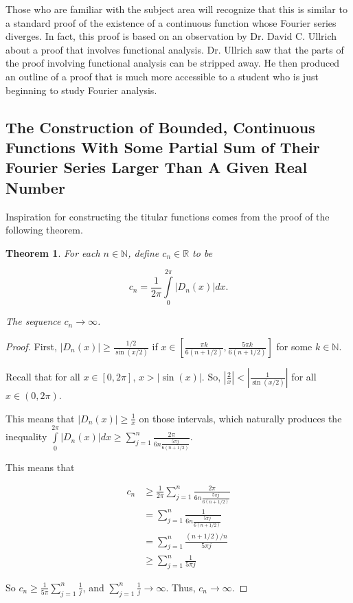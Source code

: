 \documentclass{amsart}
\newcommand{\N}{\mathbb{N}}
\newcommand{\R}{\mathbb{R}}
\newcommand{\absval}[1]{\left| #1 \right|}
\newtheorem{thm}{Theorem}[section]
\theoremstyle{definition}
\begin{document}
Those who are familiar with the subject area will recognize that this is similar to a standard proof of the existence of a continuous function whose Fourier series diverges. 
In fact, this proof is based on an observation by Dr. David C. Ullrich about a proof that involves functional analysis. 
Dr. Ullrich saw that the parts of the proof involving functional analysis can be stripped away. 
He then produced an outline of a proof that is much more accessible to a student who is just beginning to study Fourier analysis.

\subsection{The Construction of Bounded, Continuous Functions With Some Partial Sum of Their Fourier Series Larger Than A Given Real Number}\hspace*{\fill}

Inspiration for constructing the titular functions comes from the proof of the following theorem.

\begin{thm}
For each $n \in \N$, define $c_n \in \R$ to be

\begin{displaymath}
c_n = \frac{1}{2 \pi} \int\limits_0^{2\pi} \absval{D_n(x)} dx.
\end{displaymath}

The sequence $c_n \to \infty$.
\end{thm}

\begin{proof}

First, $\absval{D_n(x)} \geq \frac{1/2}{\sin(x/2)}$ if $x \in [\frac{\pi k}{6(n+1/2)},\frac{5 \pi k}{6(n+1/2)}]$ for some $k \in \N$.

Recall that for all $x \in [0, 2\pi]$, $x > \absval{\sin(x)}$. 
So, $\absval{\frac{2}{x}} < \absval{\frac{1}{\sin(x/2)}}$ for all $x \in (0,2\pi)$.

This means that $\absval{D_n(x)} \geq \frac{1}{x}$ on those intervals, which naturally produces the inequality $\int\limits_0^{2\pi} \absval{D_n(x)} dx \geq \sum\limits_{j=1}^n \frac{2 \pi}{6n \frac{5\pi j}{6(n+1/2)}}$. 

This means that 

\begin{align*}
c_n &\geq \frac{1}{2 \pi} \sum\limits_{j=1}^n \frac{2 \pi}{6n \frac{5\pi j}{6(n+1/2)}}\\
&= \sum\limits_{j=1}^n \frac{1}{6n \frac{5\pi j}{6(n+1/2)}}\\
&= \sum\limits_{j=1}^n \frac{(n+1/2)/{n}}{5\pi j}\\
&\geq \sum\limits_{j=1}^n \frac{1}{5\pi j}
\end{align*}

So $c_n \geq \frac{1}{5 \pi} \sum\limits_{j=1}^n \frac{1}{ j}$, and $\sum\limits_{j=1}^n \frac{1}{j} \to \infty$. 
Thus, $c_n \to \infty$.

\end{proof}
\end{document}
